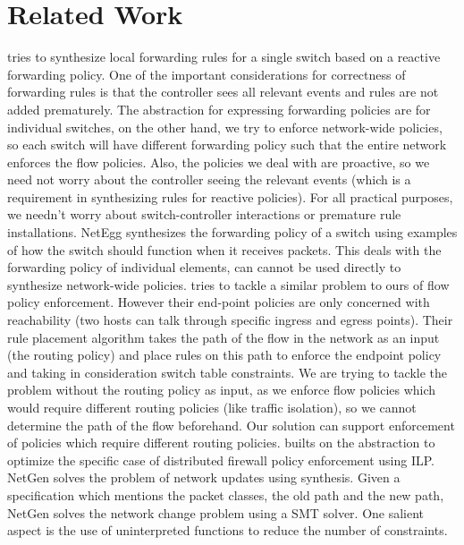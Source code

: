 \section{Related Work}
\cite{decentralize} tries to synthesize local forwarding rules for a single switch based on a reactive forwarding policy. One of the important considerations for correctness of forwarding rules is that the controller sees all relevant events and rules are not added prematurely. The abstraction for expressing forwarding policies are for individual switches, on the other hand, we try to enforce network-wide policies, so each switch will have different forwarding policy such that the entire network enforces the flow policies. Also, the policies we deal with are proactive, so we need not worry about the controller seeing the relevant events (which is a requirement in synthesizing rules for reactive policies). For all practical purposes, we needn't worry about switch-controller interactions or premature rule installations. \newline
NetEgg \cite{netegg} synthesizes the forwarding policy of a switch using examples of how the switch should function when it receives packets. This deals with the forwarding policy of individual elements, can cannot be used directly to synthesize network-wide policies. \newline
\cite{oneswitch} tries to tackle a similar problem to ours of flow policy enforcement. However their end-point policies are only concerned with reachability (two hosts can talk through specific ingress and egress points). Their rule placement algorithm takes the path of the flow in the network as an input (the routing policy) and place rules on this path to enforce the endpoint policy and taking in consideration switch table constraints. We are trying to tackle the problem without the routing policy as input, as we enforce flow policies which would require different routing policies (like traffic isolation), so we cannot determine the path of the flow beforehand. Our solution can support enforcement of policies which require different routing policies. \cite{distfirewall} builts on the \cite{oneswitch} abstraction to optimize the specific case of distributed firewall policy enforcement using ILP.  \newline
\cite{netgen} NetGen solves the problem of network updates using synthesis. Given a specification which mentions the packet classes, the old path and the new path, NetGen solves the network change problem using a SMT solver. One salient aspect is the use of uninterpreted functions to reduce the number of constraints. 